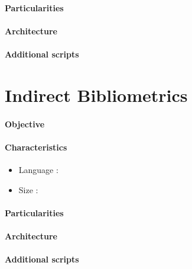 \paragraph{Particularities}

\paragraph{Architecture}

\paragraph{Additional scripts}



\newpage

\section{Indirect Bibliometrics}

\paragraph{Objective}

\paragraph{Characteristics}

\begin{itemize}
\item Language : 
\item Size :
\end{itemize}


\paragraph{Particularities}

\paragraph{Architecture}

\paragraph{Additional scripts}







